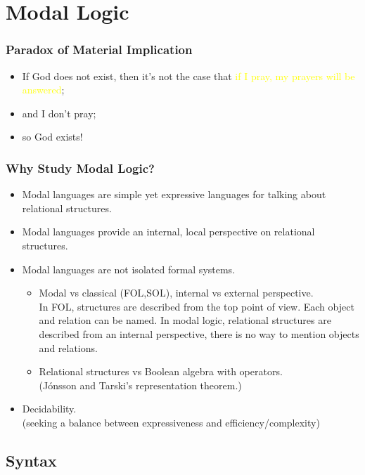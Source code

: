 \documentclass[UTF8,aspectratio=43,11pt,colorlinks,compress,openany]{beamer}%
\begin{document}
\section{Modal Logic}


\begin{frame}\frametitle{Paradox of Material Implication}
	\begin{itemize}
		\item If God does not exist, then it's not the case that \textcolor{yellow}{if I pray, my prayers will be answered};
		\item and I don't pray;
		\item so God exists!
	\end{itemize}
\end{frame}

\begin{frame}\frametitle{Why Study Modal Logic?}
	\begin{itemize}
		\item Modal languages are simple yet expressive languages for talking about relational structures.
		\item Modal languages provide an internal, local perspective on relational structures.
		\item Modal languages are not isolated formal systems.
		\begin{itemize}
			\item Modal vs classical (FOL,SOL), internal vs external perspective.\\
			In FOL, structures are described from the top point of view. Each object and relation can be named. In modal logic, relational structures are described from an internal perspective, there is no way to mention objects and relations.
			\item Relational structures vs Boolean algebra with operators.\\
			(J\'onsson and Tarski's representation theorem.)
		\end{itemize}
		\item Decidability.\\
		(seeking a balance between expressiveness and efficiency/complexity)
	\end{itemize}
\end{frame}

\subsection{Syntax}
\end{document}
